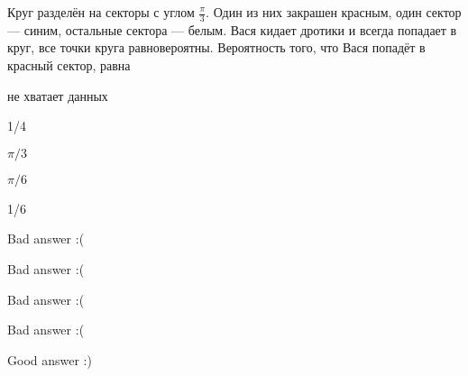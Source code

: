 
\begin{question}
Круг разделён на секторы с углом \(\frac{\pi}{3}\). Один из них закрашен
красным, один сектор — синим, остальные сектора — белым. Вася кидает
дротики и всегда попадает в круг, все точки круга равновероятны.
Вероятность того, что Вася попадёт в красный сектор, равна
\begin{answerlist}
  \item не хватает данных
  \item 1/4
  \item \(\pi / 3\)
  \item \(\pi / 6\)
  \item 1/6
\end{answerlist}
\end{question}

\begin{solution}
\begin{answerlist}
  \item Bad answer :(
  \item Bad answer :(
  \item Bad answer :(
  \item Bad answer :(
  \item Good answer :)
\end{answerlist}
\end{solution}

